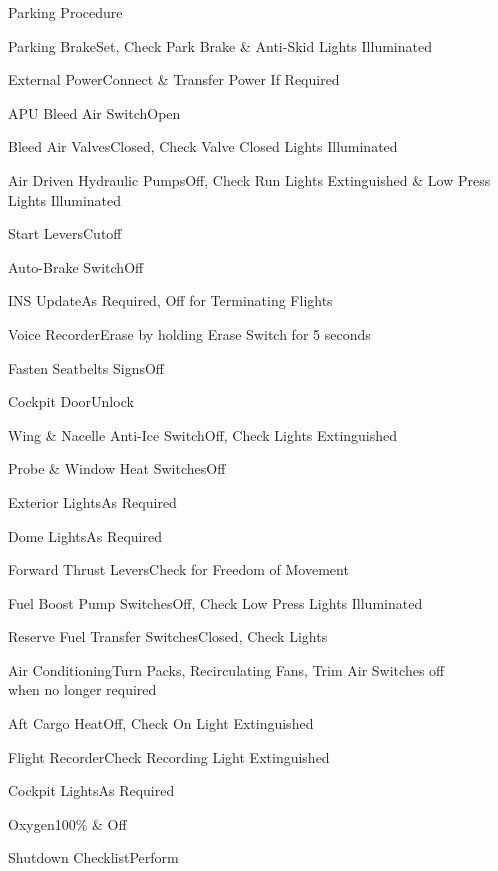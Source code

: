 \documentclass[sim-use, blue_items]{checklist}
\begin{document}
\begin{checklist}{Parking Procedure}
	\item{Parking Brake}{Set, Check Park Brake \& Anti-Skid Lights Illuminated}
	\item{External Power}{Connect \& Transfer Power If Required}
	\item{APU Bleed Air Switch}{Open}
	\item{Bleed Air Valves}{Closed, Check Valve Closed Lights Illuminated}
	\item{Air Driven Hydraulic Pumps}{Off, Check Run Lights Extinguished \& Low Press Lights Illuminated}
	\item{Start Levers}{Cutoff}
	\item{Auto-Brake Switch}{Off}
	\item{INS Update}{As Required, Off for Terminating Flights}
	\item{Voice Recorder}{Erase by holding Erase Switch for 5 seconds}
	\item{Fasten Seatbelts Signs}{Off}
	\item{Cockpit Door}{Unlock}
	\item{Wing \& Nacelle Anti-Ice Switch}{Off, Check Lights Extinguished}
	\item{Probe \& Window Heat Switches}{Off}
	\item{Exterior Lights}{As Required}
	\item{Dome Lights}{As Required}
	\item{Forward Thrust Levers}{Check for Freedom of Movement}
	\item{Fuel Boost Pump Switches}{Off, Check Low Press Lights Illuminated}
	\item{Reserve Fuel Transfer Switches}{Closed, Check Lights}
	\item{Air Conditioning}{Turn Packs, Recirculating Fans, Trim Air Switches off\\when no longer required}
	\item{Aft Cargo Heat}{Off, Check On Light Extinguished}
	\item{Flight Recorder}{Check Recording Light Extinguished}
	\item{Cockpit Lights}{As Required}
	\item{Oxygen}{100\% \& Off}
	\item{Shutdown Checklist}{Perform}
\end{checklist}
\end{document}
